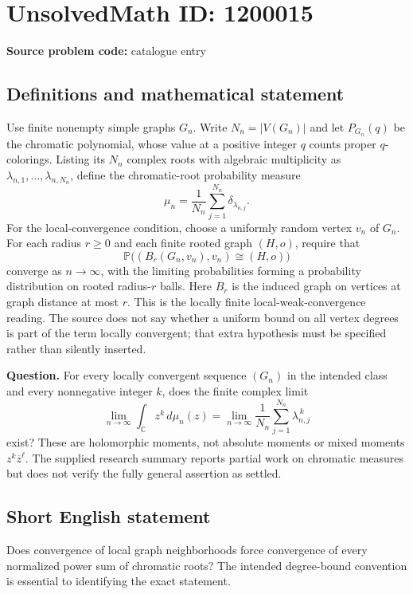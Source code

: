 \documentclass[11pt]{article}
\begin{document}
\section*{UnsolvedMath ID: 1200015}
\textbf{Source problem code:} catalogue entry
\subsection{Definitions and mathematical statement}
Use finite nonempty simple graphs $G_n$. Write $N_n=|V(G_n)|$ and let $P_{G_n}(q)$ be the chromatic polynomial, whose value at a positive integer $q$ counts proper $q$-colorings. Listing its $N_n$ complex roots with algebraic multiplicity as $\lambda_{n,1},\ldots,\lambda_{n,N_n}$, define the chromatic-root probability measure
\[
\mu_n=\frac1{N_n}\sum_{j=1}^{N_n}\delta_{\lambda_{n,j}}.
\]
For the local-convergence condition, choose a uniformly random vertex $v_n$ of $G_n$. For each radius $r\geq0$ and each finite rooted graph $(H,o)$, require that
\[
\mathbb P\big((B_r(G_n,v_n),v_n)\cong(H,o)\big)
\]
converge as $n\to\infty$, with the limiting probabilities forming a probability distribution on rooted radius-$r$ balls. Here $B_r$ is the induced graph on vertices at graph distance at most $r$. This is the locally finite local-weak-convergence reading. The source does not say whether a uniform bound on all vertex degrees is part of the term locally convergent; that extra hypothesis must be specified rather than silently inserted.

\textbf{Question.} For every locally convergent sequence $(G_n)$ in the intended class and every nonnegative integer $k$, does the finite complex limit
\[
\lim_{n\to\infty}\int_{\mathbb C}z^k\,d\mu_n(z)
=\lim_{n\to\infty}\frac1{N_n}\sum_{j=1}^{N_n}\lambda_{n,j}^{\,k}
\]
exist? These are holomorphic moments, not absolute moments or mixed moments $z^k\overline z^{\ell}$. The supplied research summary reports partial work on chromatic measures but does not verify the fully general assertion as settled.
\subsection{Short English statement}
Does convergence of local graph neighborhoods force convergence of every normalized power sum of chromatic roots? The intended degree-bound convention is essential to identifying the exact statement.
\end{document}
